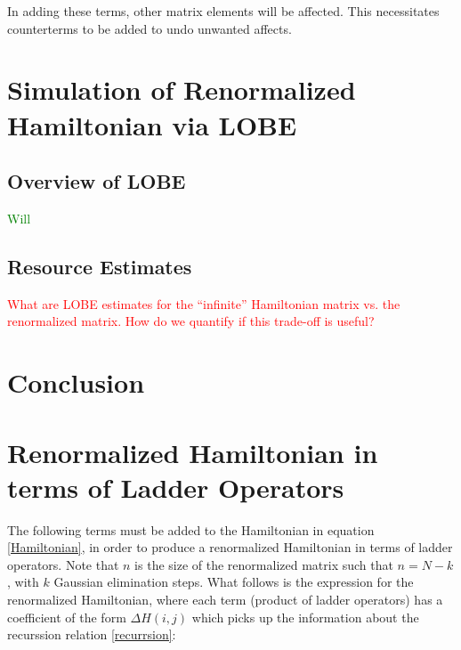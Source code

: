\documentclass[%
 reprint,
nofootinbib,
 amsmath,amssymb,
 aps,
]{revtex4-2}
\numberwithin{equation}{section}
\begin{document}
In adding these terms, other matrix elements will be affected. This necessitates counterterms to be added to undo unwanted affects. 

\section{Simulation of Renormalized Hamiltonian via LOBE}
\subsection{Overview of LOBE}
\textcolor{Green}{Will}

\subsection{Resource Estimates}
\textcolor{red}{What are LOBE estimates for the ``infinite'' Hamiltonian matrix vs. the 
renormalized matrix. How do we quantify if this trade-off is useful?}

\section{Conclusion}



\appendix
\section{Renormalized Hamiltonian in terms of Ladder Operators}
The following terms must be added to the Hamiltonian in equation \ref{Hamiltonian}, in order to produce a renormalized Hamiltonian in terms of ladder operators. Note that $n$ is the size of the renormalized matrix such that $n = N - k$, with $k$ Gaussian elimination steps.
What follows is the expression for the renormalized Hamiltonian, where each term (product of ladder operators) has a coefficient of the form $\Delta H(i,j)$ which picks up the information about the recurssion relation \ref{recurrsion}:
\end{document}
